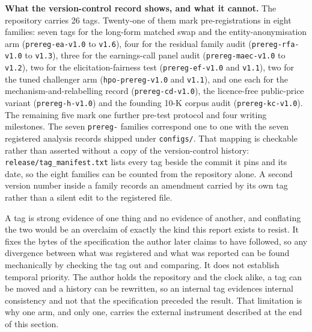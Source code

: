 \textbf{What the version-control record shows, and what it cannot.} The
repository carries 26 tags. Twenty-one of them mark pre-registrations in eight
families: seven tags for the long-form matched swap and the entity-anonymisation
arm (\texttt{prereg-ea-v1.0} to \texttt{v1.6}), four for the residual family
audit (\texttt{prereg-rfa-v1.0} to \texttt{v1.3}), three for the earnings-call
panel audit (\texttt{prereg-maec-v1.0} to \texttt{v1.2}), two for the
elicitation-fairness test (\texttt{prereg-ef-v1.0} and \texttt{v1.1}), two for
the tuned challenger arm (\texttt{hpo-prereg-v1.0} and \texttt{v1.1}), and one
each for the mechanism-and-relabelling record (\texttt{prereg-cd-v1.0}), the
licence-free public-price variant (\texttt{prereg-h-v1.0}) and the founding 10-K
corpus audit (\texttt{prereg-kc-v1.0}). %
The remaining five mark one further pre-test protocol and four writing
milestones. The seven \texttt{prereg-} families correspond one to one with the
seven registered analysis records shipped under \texttt{configs/}. That mapping is
checkable rather than asserted without a copy of the version-control history:
\texttt{release/tag\_manifest.txt} lists every tag beside the commit it pins and
its date, so the eight families can be counted from the repository alone. A second
version number inside a family records an amendment carried by its own tag rather
than a silent edit to the registered file. %

A tag is strong evidence of one thing and no evidence of another, and conflating
the two would be an overclaim of exactly the kind this report exists to resist.
It fixes the bytes of the specification the author later claims to have
followed, so any divergence between what was registered and what was reported
can be found mechanically by checking the tag out and comparing. It does not
establish temporal priority. The author holds the repository and the clock
alike, a tag can be moved and a history can be rewritten, so an internal tag
evidences internal consistency and not that the specification preceded the
result. That limitation is why one arm, and only one, carries the external
instrument described at the end of this section.

